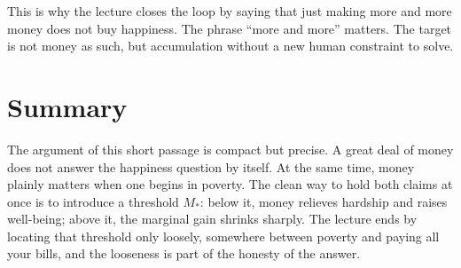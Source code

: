 This is why the lecture closes the loop by saying that just making more and more money does not buy happiness. The phrase ``more and more'' matters. The target is not money as such, but accumulation without a new human constraint to solve.

\section{Summary}

The argument of this short passage is compact but precise. A great deal of money does not answer the happiness question by itself. At the same time, money plainly matters when one begins in poverty. The clean way to hold both claims at once is to introduce a threshold \(M_*\): below it, money relieves hardship and raises well-being; above it, the marginal gain shrinks sharply. The lecture ends by locating that threshold only loosely, somewhere between poverty and paying all your bills, and the looseness is part of the honesty of the answer.